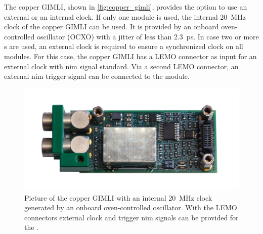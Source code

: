 The copper GIMLI, shown in \autoref{fig:copper_gimli}, provides the option to use an external or an internal clock.
If only one  module is used, the internal \SI{20}{\mega\hertz} clock of the copper GIMLI can be used.
It is provided by an onboard oven-controlled oscillator (OCXO) with a jitter of less than \SI{2.3}{\pico\second}.
In case two or more s are used, an external clock is required to ensure a synchronized clock on all  modules.
For this case, the copper GIMLI has a LEMO connector as input for an external clock with \ac{nim} signal standard.
Via a second LEMO connector, an external \ac{nim} trigger signal can be connected to the  module.

\begin{figure}
	\centering
	\includegraphics[width=.5\textwidth]{pictures/copper_gimli.png}
	\caption[Copper GIMLI]{Picture of the copper GIMLI with an internal \SI{20}{\mega\hertz} clock generated by an onboard oven-controlled oscillator. With the LEMO connectors external clock and trigger \ac{nim} signals can be provided for the . \cite{herrmann}}
	\label{fig:copper_gimli}
\end{figure}



